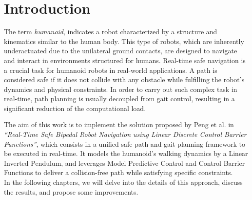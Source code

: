 \documentclass[main.tex]{subfiles}
\begin{document}
\section{Introduction}\label{sec:introduction}

The term \textit{humanoid}, indicates a robot characterized by a structure and kinematics similar to the human body. This type of robots, which are inherently underactuated due to the unilateral ground contacts, are designed to navigate and interact in environments structured for humans.
Real-time safe navigation is a crucial task for humanoid robots in real-world applications. A path is considered safe if it does not collide with any obstacle while fulfilling the robot's dynamics and physical constraints. In order to carry out such complex task in real-time, path planning is usually decoupled from gait control, resulting in a significant reduction of the computational load.

The aim of this work is to implement the solution proposed by Peng et al. in \textit{``Real-Time Safe Bipedal Robot Navigation using Linear Discrete Control Barrier Functions''}, which consists in a unified safe path and gait planning framework to be executed in real-time. It models the humanoid's walking dynamics by a Linear Inverted Pendulum, and leverages Model Predictive Control and Control Barrier Functions to deliver a collision-free path while satisfying specific constraints.\\
In the following chapters, we will delve into the details of this approach, discuss the results, and propose some improvements.
\end{document}
